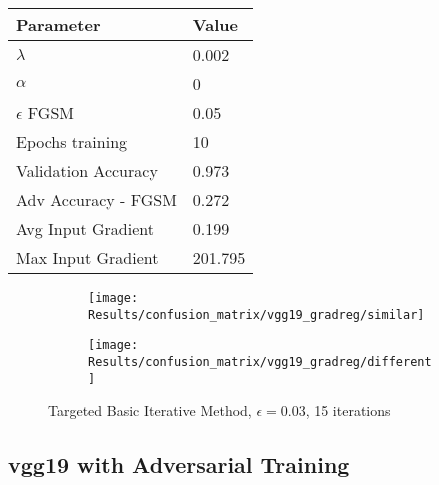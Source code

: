 \documentclass[draft,final]{vutinfth} %
\begin{document}
\begin{table}[h]
  \centering
  \begin{tabular}{ll}
    \toprule
			Parameter			& Value   \\
    \midrule
			$\lambda$								& 0.002				\\
			$\alpha$								& 0				\\
			$\epsilon$ FGSM					& 0.05		\\
			Epochs training					& 10			\\
			
			Validation Accuracy			& 0.973		\\ 
			Adv Accuracy - FGSM			& 0.272		\\
			
			Avg Input Gradient			& 0.199		\\
			Max Input Gradient			& 201.795	\\
    \bottomrule
  \end{tabular}
\end{table}


\begin{figure}[h]
  \begin{subfigure}[b]{0.5\columnwidth}
		\centering
    \texttt{[image: Results/confusion\_matrix/vgg19\_gradreg/similar]}
    \label{fig:exp:cm:vgg19_gradreg:similar}
  \end{subfigure}
  \begin{subfigure}[b]{0.5\columnwidth}
		\centering
    \texttt{[image: Results/confusion\_matrix/vgg19\_gradreg/different]}
    \label{fig:exp:cm:vgg19_gradreg:different}
  \end{subfigure}
  \caption{Targeted Basic Iterative Method, $\epsilon = 0.03$, 15 iterations}
  \label{fig:exp:cm:vgg19_gradreg}
\end{figure}
\clearpage

\subsection{vgg19 with Adversarial Training}
\end{document}
